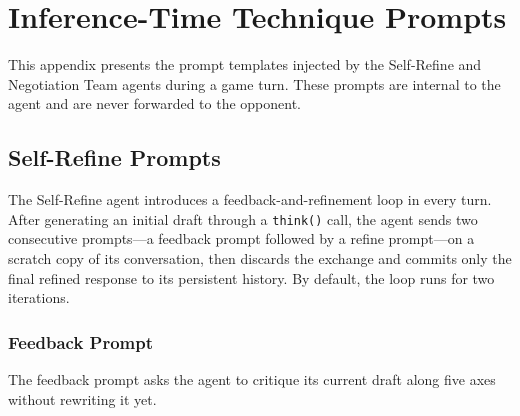 \chapter{Inference-Time Technique Prompts} \label{ap1:it-prompts}

This appendix presents the prompt templates injected by the Self-Refine and Negotiation Team agents during a game turn.
These prompts are internal to the agent and are never forwarded to the opponent.


\section{Self-Refine Prompts}
\label{ap1:sr-prompts}

The Self-Refine agent \parencite{madaan_self-refine_2023} introduces a feedback-and-refinement loop in every turn.
After generating an initial draft through a \texttt{think()} call, the agent sends two consecutive prompts---a feedback prompt followed by a refine prompt---on a scratch copy of its conversation, then discards the exchange and commits only the final refined response to its persistent history.
By default, the loop runs for two iterations.

\subsection{Feedback Prompt}

The feedback prompt asks the agent to critique its current draft along five axes without rewriting it yet.

